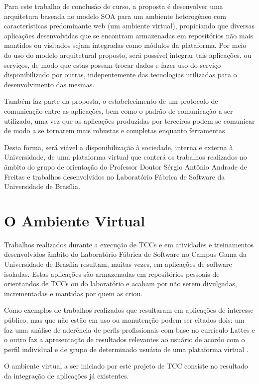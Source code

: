 Para este trabalho de conclusão de curso, a proposta é desenvolver uma arquitetura baseada no modelo SOA para um ambiente heterogêneo com características predominante web (um ambiente virtual), propiciando que diversas aplicações desenvolvidas que se encontram armazenadas em repositórios não mais mantidos ou visitados sejam integradas como módulos da plataforma. Por meio do uso do modelo arquitetural proposto, será possível integrar tais aplicações, ou serviços, de modo que estas possam trocar dados e fazer uso do serviço disponibilizado por outras, indepentemente das tecnologias utilizadas para o desenvolvimento das mesmas.

Também faz parte da proposta, o estabelecimento de um protocolo de comunicação entre as aplicações, bem como o padrão de comunicação a ser utilizado, uma vez que as aplicações produzidas por terceiros podem se comunicar de modo a se tornarem mais robustas e completas enquanto ferramentas.

Desta forma, será viável a disponibilização à sociedade, interna e externa à Universidade, de uma plataforma virtual que conterá os trabalhos realizados no âmbito do grupo de orientação do Professor Doutor Sérgio Antônio Andrade de Freitas e trabalhos desenvolvidos no Laboratório Fábrica de Software da Universidade de Brasília.

\section{O Ambiente Virtual}

Trabalhos realizados durante a execução de TCCs e em atividades e treinamentos desenvolvidos âmbito do Laboratório Fábrica de Software no Campus Gama da Universidade de Brasília resultam, muitas vezes, em aplicações de software isoladas. Estas aplicações são armazenadas em repositórios pessoais de orientandos de TCCs ou do laboratório e acabam por não serem divulgadas, incrementadas e mantidas por quem as criou.

Como exemplos de trabalhos realizados que resultaram em aplicações de interesse público, mas que não estão em uso ou manutenção podem ser citados dois: um faz uma análise de aderência de perfis profissionais com base no currículo Lattes \cite{jesus_algoritmo_2014} e o outro faz a apresentação de resultados relevantes ao usuário de acordo com o perfil individual e de grupo de determinado usuário de uma plataforma virtual \cite{carvalho_sistema_2014}.

O ambiente virtual a ser iniciado por este projeto de TCC consiste no resultado da integração de aplicações já existentes.

